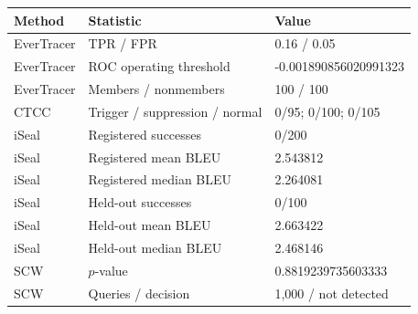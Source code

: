 \begin{tabular}{lll}
\toprule
Method & Statistic & Value \\
\midrule
EverTracer & TPR / FPR & 0.16 / 0.05 \\
EverTracer & ROC operating threshold & -0.001890856020991323 \\
EverTracer & Members / nonmembers & 100 / 100 \\
CTCC & Trigger / suppression / normal & 0/95; 0/100; 0/105 \\
iSeal & Registered successes & 0/200 \\
iSeal & Registered mean BLEU & 2.543812 \\
iSeal & Registered median BLEU & 2.264081 \\
iSeal & Held-out successes & 0/100 \\
iSeal & Held-out mean BLEU & 2.663422 \\
iSeal & Held-out median BLEU & 2.468146 \\
SCW & $p$-value & 0.8819239735603333 \\
SCW & Queries / decision & 1,000 / not detected \\
\bottomrule
\end{tabular}
